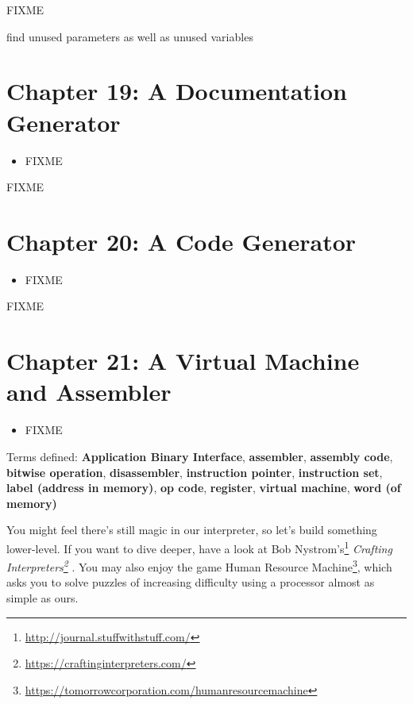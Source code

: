\documentclass{scrbook}
\newcommand{\glossref}[1]{\textbf{#1}}
\newcommand{\hreffoot}[2]{{#1}\footnote{\href{#2}{#2}}}
\begin{document}
FIXME


find unused parameters as well as unused variables

\chapter{Chapter 19: A Documentation Generator}\label{docgen}

\begin{itemize}

\item FIXME

\end{itemize}


FIXME

\chapter{Chapter 20: A Code Generator}\label{codegen}

\begin{itemize}

\item FIXME

\end{itemize}


FIXME

\chapter{Chapter 21: A Virtual Machine and Assembler}\label{vm}

\begin{itemize}

\item FIXME

\end{itemize}


\noindent 
    Terms defined:
    \glossref{Application Binary Interface}, \glossref{assembler}, \glossref{assembly code}, \glossref{bitwise operation}, \glossref{disassembler}, \glossref{instruction pointer}, \glossref{instruction set}, \glossref{label (address in memory)}, \glossref{op code}, \glossref{register}, \glossref{virtual machine}, \glossref{word (of memory)}



You might feel there's still magic in our interpreter,
so let's build something lower-level.
If you want to dive deeper,
have a look at \hreffoot{Bob Nystrom's}{http://journal.stuffwithstuff.com/}
\emph{\hreffoot{Crafting Interpreters}{https://craftinginterpreters.com/}} \cite{Nystrom2021}.
You may also enjoy the game \hreffoot{Human Resource Machine}{https://tomorrowcorporation.com/humanresourcemachine},
which asks you to solve puzzles of increasing difficulty
using a processor almost as simple as ours.
\end{document}
